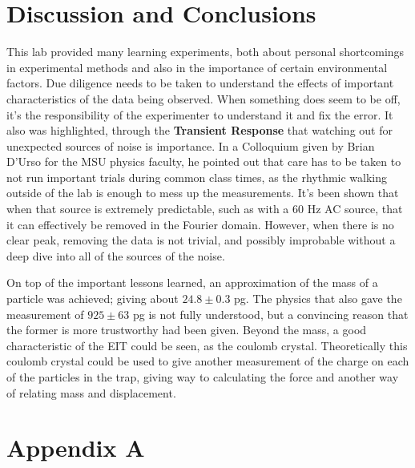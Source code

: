 \documentclass[12pt]{article}
\begin{document}

\section{Discussion and Conclusions}

This lab provided many learning experiments, both about personal shortcomings in experimental methods and also in the importance of certain environmental factors. Due diligence needs to be taken to understand the effects of important characteristics of the data being observed. When something does seem to be off, it's the responsibility of the experimenter to understand it and fix the error. It also was highlighted, through the \textbf{Transient Response} that watching out for unexpected sources of noise is importance. In a Colloquium given by Brian D'Urso for the MSU physics faculty, he pointed out that care has to be taken to not run important trials during common class times, as the rhythmic walking outside of the lab is enough to mess up the measurements. It's been shown that when that source is extremely predictable, such as with a 60 Hz AC source, that it can effectively be removed in the Fourier domain. However, when there is no clear peak, removing the data is not trivial, and possibly improbable without a deep dive into all of the sources of the noise. 

On top of the important lessons learned, an approximation of the mass of a particle was achieved; giving about $24.8 \pm 0.3$ pg. The physics that also gave the measurement of $925 \pm 63$ pg is not fully understood, but a convincing reason that the former is more trustworthy had been given. Beyond the mass, a good characteristic of the EIT could be seen, as the coulomb crystal. Theoretically this coulomb crystal could be used to give another measurement of the charge on each of the particles in the trap, giving way to calculating the force and another way of relating mass and displacement.


\newpage
\clearpage
\section*{Appendix A}
\end{document}
